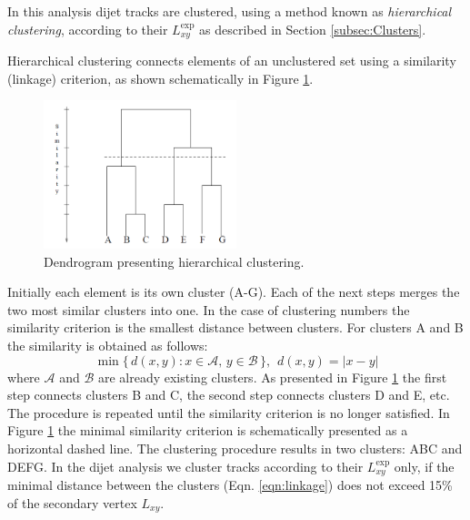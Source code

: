 
In this analysis dijet tracks are clustered, using a method known as {\it hierarchical clustering}, according to 
their $L_{xy}^\text{exp}$ as described in Section \ref{subsec:Clusters}.

Hierarchical clustering connects elements of an unclustered set using a similarity (linkage) criterion,
as shown schematically in Figure \ref{fig:dendrogram}.
\begin{figure}[htbp]
\centering
\includegraphics[width=0.5\textwidth]{plots/dendrogram2.png}
\caption{Dendrogram presenting hierarchical clustering. \label{fig:dendrogram}}
\end{figure}

 Initially each element is its own cluster (A-G). Each of the next steps merges 
the two most similar clusters into one.
In the case of clustering numbers the similarity criterion is the smallest distance 
between clusters. For clusters A and B the similarity is obtained as follows:
\begin{equation}
\min \{\, d(x,y) : x \in \mathcal{A},\, y \in \mathcal{B} \,\}, \hspace{5pt} d(x,y)=|x-y| 
\label{eqn:linkage}
\end{equation}
where $\mathcal{A}$ and $\mathcal{B}$ are already existing clusters.
 As presented in Figure \ref{fig:dendrogram} the first step connects clusters B and C, the second step connects clusters D and E, etc.
The procedure is repeated until the similarity criterion is no longer satisfied. In Figure \ref{fig:dendrogram} the minimal similarity criterion is 
schematically presented as a horizontal
dashed line. The clustering procedure results in two clusters: ABC and DEFG. In the dijet analysis we cluster tracks according to 
their $L_{xy}^\text{exp}$ only, if the minimal distance between the clusters (Eqn. \ref{eqn:linkage}) does not exceed 15\% of the secondary vertex $L_{xy}$.

